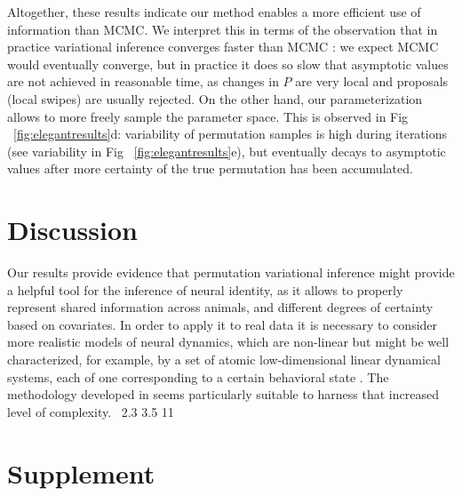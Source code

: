 \documentclass[twoside]{article}
\begin{document}
Altogether, these results indicate our method enables a more efficient use of information than MCMC. We interpret this in terms of the observation that in practice variational inference converges faster than MCMC \cite{Blei2017}: we expect MCMC would eventually converge, but in practice it does so slow that asymptotic values are not achieved in reasonable time, as changes in $P$ are very local and proposals (local swipes) are usually rejected. On the other hand, our parameterization allows to more freely sample the parameter space. This is observed in Fig  ~\ref{fig:elegantresults}d: variability of permutation samples is high during iterations (see variability in Fig ~\ref{fig:elegantresults}e), but eventually decays to asymptotic values after more certainty of the true permutation has been accumulated.
\section{Discussion}
Our results provide evidence that permutation variational inference might provide a helpful tool for the inference of neural identity, as it allows to properly represent shared information across animals, and different degrees of certainty based on covariates. In order to apply it to real data it is necessary to consider more realistic models of neural dynamics, which are non-linear but might be well characterized, for example, by a set of atomic low-dimensional linear dynamical systems, each of one corresponding to a certain behavioral state  \cite{Kato2015}. The methodology developed in \cite{Linderman2016} seems particularly suitable to harness that increased level of complexity. \
2.3 3.5 11


\pagebreak 
\appendix
\section*{Supplement}
\end{document}
